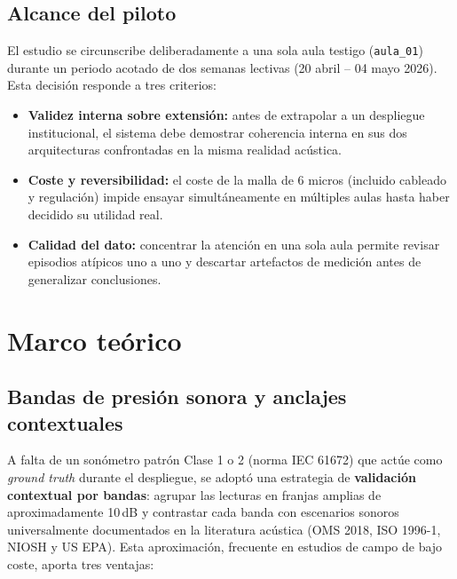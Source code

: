 \documentclass[11pt,a4paper,openany]{report}
\begin{document}
\section{Alcance del piloto}

El estudio se circunscribe deliberadamente a una sola aula testigo (\texttt{aula\_01}) durante un periodo acotado de dos semanas lectivas (20 abril -- 04 mayo 2026). Esta decisi\'on responde a tres criterios:

\begin{itemize}
    \item \textbf{Validez interna sobre extensi\'on:} antes de extrapolar a un despliegue institucional, el sistema debe demostrar coherencia interna en sus dos arquitecturas confrontadas en la misma realidad ac\'ustica.
    \item \textbf{Coste y reversibilidad:} el coste de la malla de 6 micros (incluido cableado y regulaci\'on) impide ensayar simult\'aneamente en m\'ultiples aulas hasta haber decidido su utilidad real.
    \item \textbf{Calidad del dato:} concentrar la atenci\'on en una sola aula permite revisar episodios at\'ipicos uno a uno y descartar artefactos de medici\'on antes de generalizar conclusiones.
\end{itemize}

\chapter{Marco te\'orico}

\section{Bandas de presi\'on sonora y anclajes contextuales}

A falta de un son\'ometro patr\'on Clase 1 o 2 (norma IEC 61672) que act\'ue como \emph{ground truth} durante el despliegue, se adopt\'o una estrategia de \textbf{validaci\'on contextual por bandas}: agrupar las lecturas en franjas amplias de aproximadamente 10\,dB y contrastar cada banda con escenarios sonoros universalmente documentados en la literatura ac\'ustica (OMS 2018, ISO 1996-1, NIOSH y US EPA). Esta aproximaci\'on, frecuente en estudios de campo de bajo coste, aporta tres ventajas:
\end{document}
